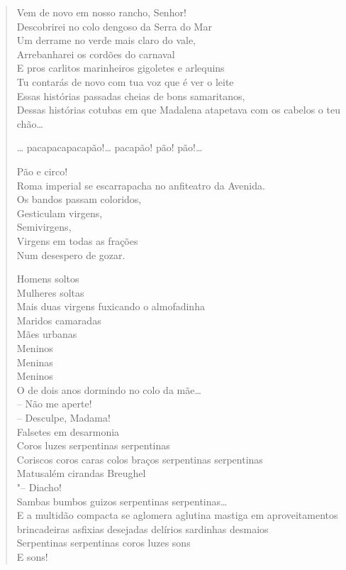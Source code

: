 \begin{verse}
Vem de novo em nosso rancho, Senhor!\\
Descobrirei no colo dengoso da Serra do Mar\\
Um derrame no verde mais claro do vale,\\
Arrebanharei os cordões do carnaval\\
E pros carlitos marinheiros gigoletes e arlequins\\
Tu contarás de novo com tua voz que é ver o leite\\
Essas histórias passadas cheias de bons samaritanos,\\
Dessas histórias cotubas em que Madalena atapetava com os cabelos o teu chão\ldots{}

\ldots{} pacapacapacapão!\ldots{} pacapão! pão! pão!\ldots{}

Pão e circo!\\
Roma imperial se escarrapacha no anfiteatro da Avenida.\\
Os bandos passam coloridos,\\
Gesticulam virgens,\\
Semivirgens,\\
Virgens em todas as frações\\
Num desespero de gozar.

Homens soltos\\
Mulheres soltas\\
Mais duas virgens fuxicando o almofadinha\\
Maridos camaradas\\
Mães urbanas\\
Meninos\\
Meninas\\
Meninos\\
O de dois anos dormindo no colo da mãe\ldots{}\\
-- Não me aperte!\\
\quad{}-- Desculpe, Madama!\\
Falsetes em desarmonia\\
Coros luzes serpentinas serpentinas\\
Coriscos coros caras colos braços serpentinas serpentinas\\
Matusalém cirandas Breughel\\
\quad\quad\quad"-- Diacho!\\
Sambas bumbos guizos serpentinas serpentinas\ldots{}\\
E a multidão compacta se aglomera aglutina mastiga em aproveitamentos
brincadeiras asfixias desejadas delírios sardinhas desmaios\\
Serpentinas serpentinas coros luzes sons\\
E sons!\\


\end{verse}
